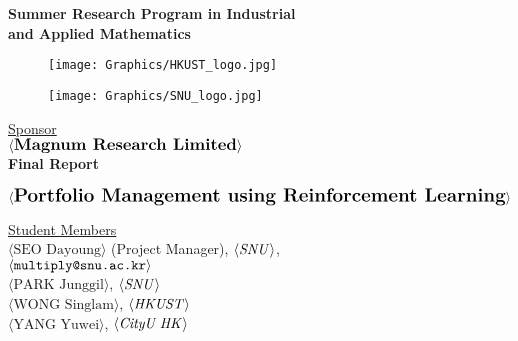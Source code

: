 \thispagestyle{empty}

\def\shiftdowna{0.32in}  %
\def\shiftdownb{0.22in}  %


\begin{center}
\textbf{{\large Summer Research Program in Industrial \\ and Applied Mathematics}}\\

\vspace \shiftdowna

\begin{figure}[h]
  \centering
  \begin{minipage}[b]{0.4\textwidth}
    \centering
    \texttt{[image: Graphics/HKUST\_logo.jpg]}
      \end{minipage}
  \begin{minipage}[b]{0.4\textwidth}
    \centering
    \texttt{[image: Graphics/SNU\_logo.jpg]}
      \end{minipage}
\end{figure}

\vspace \shiftdowna
\underline {Sponsor}\\ 
\vspace{5pt}
$\langle \textbf{{\large Magnum Research Limited}} \rangle$ \\
\vspace \shiftdowna
\textbf{Final Report}

\vspace \shiftdowna
$\langle \textbf{{\Large Portfolio Management using Reinforcement Learning}}\rangle$


\vspace{0.35in}
\underline {Student Members}\\
\vspace{5pt}
$\langle \text{SEO Dayoung}\rangle$ (Project Manager), $\langle \text{\emph{SNU}}\rangle$,\\ 
\vspace{3pt}
$\langle \text{\texttt{multiply@snu.ac.kr}} \rangle$\\
\vspace{5pt}
$\langle \text{PARK Junggil}\rangle$, $\langle \text{\emph{SNU}} \rangle$ \\
\vspace{3pt}
$\langle \text{WONG Singlam}\rangle$, $\langle \text{\emph{HKUST}} \rangle$ \\
\vspace{3pt}
$\langle \text{YANG Yuwei}\rangle$, $\langle \text{\emph{CityU HK}} \rangle$ \\


\end{center}
